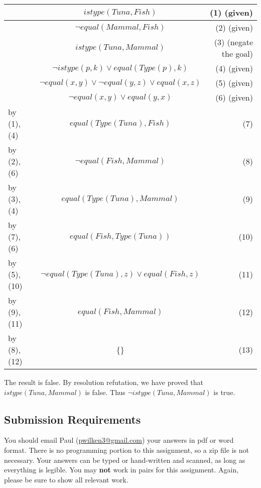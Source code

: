 \documentclass[12pt]{article}
\begin{document}
\begin{enumerate}
\begin{table}[h!]
  \begin{center}
    \label{tab:table1}
    \begin{tabular}{l|c|r}
       & \(istype(Tuna,Fish)\)  & (1) (given)\\
       \hline
       & \(\lnot equal(Mammal,Fish)\) & (2) (given)\\
       \hline   
       & \(istype(Tuna,Mammal)\) & (3) (negate the goal)\\
       \hline
       & \(\lnot istype(p,k) \lor equal(Type(p),k)\) & (4) (given)\\
       \hline
       & \(\lnot equal(x,y) \lor \lnot equal(y,z) \lor equal(x,z)\) & (5) (given)\\
       \hline
       & \(\lnot equal(x,y) \lor equal(y,x)\) & (6) (given)\\
       \hline
       by (1), (4) & \(equal(Type(Tuna),Fish)\) & (7)\\
       \hline
       by (2), (6) & \(\lnot equal(Fish, Mammal)\) & (8)\\
       \hline 
       by (3), (4) & \(equal(Type(Tuna), Mammal)\) & (9)\\
       \hline
       by (7), (6) & \(equal(Fish, Type(Tuna))\) & (10)\\
       \hline
       by (5), (10) & \(\lnot equal(Type(Tuna), z) \lor equal(Fish, z)\) & (11)\\
       \hline
       by (9), (11) & \(equal(Fish, Mammal)\) & (12)\\
       \hline
       by (8), (12) & \{\} & (13)\\
    \end{tabular}
  \end{center}
\end{table}
The result is false. By resolution refutation, we have proved that \(istype(Tuna,Mammal)\) is false. Thus \(\lnot istype(Tuna,Mammal)\) is true.

\end{enumerate}

\subsection*{Submission Requirements}
You should email Paul (\url{pwilken3@gmail.com}) your answers in pdf or word format. There is no programming portion to this assignment, so a zip file is not necessary. Your answers can be typed or hand-written and scanned, as long as everything is legible. You may \textbf{not} work in pairs for this assignment. Again, please be sure to show all relevant work.
\end{document}
